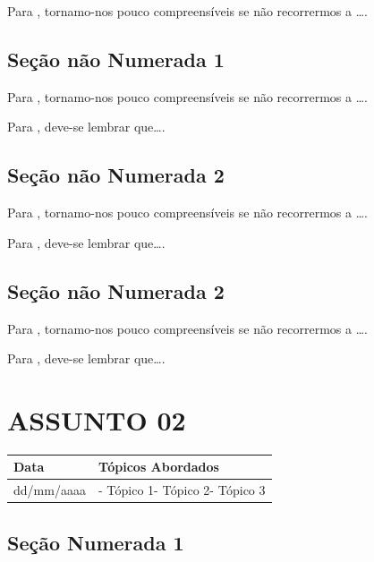 \documentclass[
]{book}
\begin{document}
Para \citet{BOCK2001}, tornamo-nos pouco compreensíveis se não recorrermos a \ldots.

\hypertarget{seuxe7uxe3o-nuxe3o-numerada-1-9}{%
\subsection*{Seção não Numerada 1}\label{seuxe7uxe3o-nuxe3o-numerada-1-9}}

Para \citet{BOCK2001}, tornamo-nos pouco compreensíveis se não recorrermos a \ldots.

Para \citet{DAVIDOFF2001}, deve-se lembrar que\ldots.

\hypertarget{seuxe7uxe3o-nuxe3o-numerada-2-13}{%
\subsection*{Seção não Numerada 2}\label{seuxe7uxe3o-nuxe3o-numerada-2-13}}

Para \citet{BOCK2001}, tornamo-nos pouco compreensíveis se não recorrermos a \ldots.

Para \citet{DAVIDOFF2001}, deve-se lembrar que\ldots.

\hypertarget{seuxe7uxe3o-nuxe3o-numerada-2-14}{%
\subsection*{Seção não Numerada 2}\label{seuxe7uxe3o-nuxe3o-numerada-2-14}}

Para \citet{BOCK2001}, tornamo-nos pouco compreensíveis se não recorrermos a \ldots.

Para \citet{DAVIDOFF2001}, deve-se lembrar que\ldots.

\hypertarget{assunto-02}{%
\section{ASSUNTO 02}\label{assunto-02}}

\begin{longtable}[]{@{}ll@{}}
\toprule()
Data & Tópicos Abordados \\
\midrule()
\endhead
dd/mm/aaaa & - Tópico 1- Tópico 2- Tópico 3 \\
\bottomrule()
\end{longtable}

\hypertarget{seuxe7uxe3o-numerada-1-5}{%
\subsection{Seção Numerada 1}\label{seuxe7uxe3o-numerada-1-5}}
\end{document}
